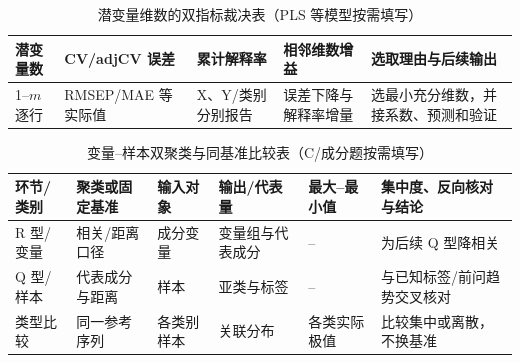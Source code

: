 \documentclass[withoutpreface,bwprint]{cumcmthesis}
\begin{document}
  \begin{table}[H]
    \centering
    \small
    \caption{潜变量维数的双指标裁决表（PLS 等模型按需填写）}
    \label{tab:latent-dimension-decision-guide}
    \begin{tabular}{@{}p{1.7cm}p{2.5cm}p{2.5cm}p{2.55cm}p{3.35cm}@{}}
      \toprule
      潜变量数 & CV/adjCV 误差 & 累计解释率 & 相邻维数增益 & 选取理由与后续输出 \\
      \midrule
      1--$m$ 逐行 & RMSEP/MAE 等实际值 & X、Y/类别分别报告 & 误差下降与解释率增量 & 选最小充分维数，并接系数、预测和验证 \\
      \bottomrule
    \end{tabular}
  \end{table}
  \begin{table}[H]
    \centering
    \small
    \caption{变量--样本双聚类与同基准比较表（C/成分题按需填写）}
    \label{tab:rq-anchor-comparison-guide}
    \begin{tabular}{p{1.65cm}p{2.25cm}p{2.05cm}p{2.15cm}p{2.2cm}p{2.9cm}}
      \toprule
      环节/类别 & 聚类或固定基准 & 输入对象 & 输出/代表量 & 最大--最小值 & 集中度、反向核对与结论 \\
      \midrule
      R 型/变量 & 相关/距离口径 & 成分变量 & 变量组与代表成分 & -- & 为后续 Q 型降相关 \\
      Q 型/样本 & 代表成分与距离 & 样本 & 亚类与标签 & -- & 与已知标签/前问趋势交叉核对 \\
      类型比较 & 同一参考序列 & 各类别样本 & 关联分布 & 各类实际极值 & 比较集中或离散，不换基准 \\
      \bottomrule
    \end{tabular}
  \end{table}
\fi
\end{document}
